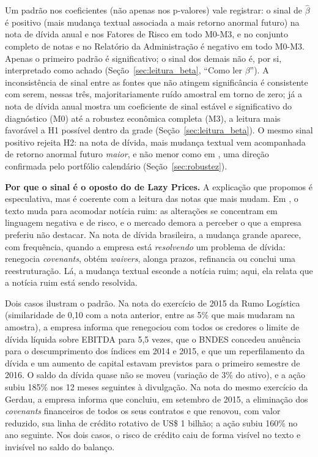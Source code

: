 \documentclass[a4paper,12pt]{report}
\begin{document}
Um padrão nos coeficientes (não apenas nos p-valores) vale registrar: o sinal de $\hat\beta$ é positivo (mais mudança textual associada a mais retorno anormal futuro) na nota de dívida anual e nos Fatores de Risco em todo M0-M3, e no conjunto completo de notas e no Relatório da Administração é negativo em todo M0-M3. Apenas o primeiro padrão é significativo; o sinal dos demais não é, por si, interpretado como achado (Seção~\ref{sec:leitura_beta}, ``Como ler $\beta$''). A inconsistência de sinal entre as fontes que não atingem significância é consistente com serem, nessas três, majoritariamente ruído amostral em torno de zero; já a nota de dívida anual mostra um coeficiente de sinal estável e significativo do diagnóstico (M0) até a robustez econômica completa (M3), a leitura mais favorável a H1 possível dentro da grade (Seção~\ref{sec:leitura_beta}). O mesmo sinal positivo rejeita H2: na nota de dívida, mais mudança textual vem acompanhada de retorno anormal futuro \emph{maior}, e não menor como em , uma direção confirmada pelo portfólio calendário (Seção~\ref{sec:robustez}).

\textbf{Por que o sinal é o oposto do de Lazy Prices.} A explicação que propomos é especulativa, mas é coerente com a leitura das notas que mais mudam. Em , o texto muda para acomodar notícia ruim: as alterações se concentram em linguagem negativa e de risco, e o mercado demora a perceber o que a empresa preferiu não destacar. Na nota de dívida brasileira, a mudança grande aparece, com frequência, quando a empresa está \emph{resolvendo} um problema de dívida: renegocia \textit{covenants}, obtém \textit{waivers}, alonga prazos, refinancia ou conclui uma reestruturação. Lá, a mudança textual esconde a notícia ruim; aqui, ela relata que a notícia ruim está sendo resolvida.

Dois casos ilustram o padrão. Na nota do exercício de 2015 da Rumo Logística (similaridade de 0,10 com a nota anterior, entre as 5\% que mais mudaram na amostra), a empresa informa que renegociou com todos os credores o limite de dívida líquida sobre EBITDA para 5,5 vezes, que o BNDES concedeu anuência para o descumprimento dos índices em 2014 e 2015, e que um reperfilamento da dívida e um aumento de capital estavam previstos para o primeiro semestre de 2016. O saldo da dívida quase não se moveu (variação de 3\% do ativo), e a ação subiu 185\% nos 12 meses seguintes à divulgação. Na nota do mesmo exercício da Gerdau, a empresa informa que concluiu, em setembro de 2015, a eliminação dos \textit{covenants} financeiros de todos os seus contratos e que renovou, com valor reduzido, sua linha de crédito rotativo de US\$ 1 bilhão; a ação subiu 160\% no ano seguinte. Nos dois casos, o risco de crédito caiu de forma visível no texto e invisível no saldo do balanço.
\end{document}

